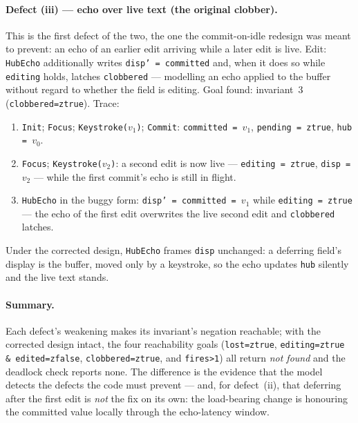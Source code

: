 \documentclass[a4paper,10pt,fleqn]{article}
\begin{document}
\paragraph{Defect (iii) --- echo over live text (the original clobber).}
This is the first defect of the two, the one the commit-on-idle redesign was
meant to prevent: an echo of an earlier edit arriving while a later edit is live.
Edit: \texttt{HubEcho} additionally writes \texttt{disp' = committed} and, when
it does so while \texttt{editing} holds, latches \texttt{clobbered} ---
modelling an echo applied to the buffer without regard to whether the field is
editing.  Goal found: invariant~3 (\texttt{clobbered=ztrue}).  Trace:
\begin{enumerate}
  \item \texttt{Init}; \texttt{Focus}; \texttt{Keystroke($v_1$)};
    \texttt{Commit}: \texttt{committed = $v_1$}, \texttt{pending = ztrue},
    \texttt{hub = $v_0$}.
  \item \texttt{Focus}; \texttt{Keystroke($v_2$)}: a second edit is now live ---
    \texttt{editing = ztrue}, \texttt{disp = $v_2$} --- while the first commit's
    echo is still in flight.
  \item \texttt{HubEcho} in the buggy form: \texttt{disp' = committed = $v_1$}
    while \texttt{editing = ztrue} --- the echo of the first edit overwrites the
    live second edit and \texttt{clobbered} latches.
\end{enumerate}
Under the corrected design, \texttt{HubEcho} frames \texttt{disp} unchanged: a
deferring field's display is the buffer, moved only by a keystroke, so the echo
updates \texttt{hub} silently and the live text stands.

\paragraph{Summary.}
Each defect's weakening makes its invariant's negation reachable; with the
corrected design intact, the four reachability goals (\texttt{lost=ztrue},
\texttt{editing=ztrue \& edited=zfalse}, \texttt{clobbered=ztrue}, and
\texttt{fires>1}) all return \emph{not found} and the deadlock check reports
none.  The difference is the evidence that the model detects the defects the
code must prevent --- and, for defect~(ii), that deferring after the first edit
is \emph{not} the fix on its own: the load-bearing change is honouring the
committed value locally through the echo-latency window.

\end{document}
